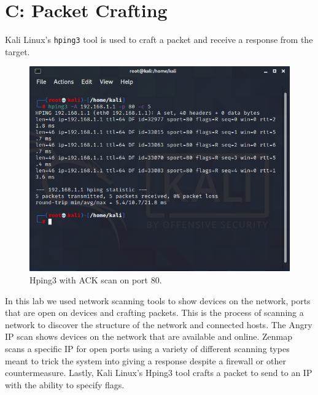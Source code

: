\section*{C: Packet Crafting}
Kali Linux's \verb|hping3| tool is used to craft a packet and receive a response from the target.

\begin{figure}[H]
    \centering
    \includegraphics[width=\linewidth]{figures/c1.png}
    \caption{Hping3 with ACK scan on port 80.}
\end{figure}

In this lab we used network scanning tools to show devices on the network, ports that are open on devices and crafting packets.
This is the process of scanning a network to discover the structure of the network and connected hosts.
The Angry IP scan shows devices on the network that are available and online.
Zenmap scans a specific IP for open ports using a variety of different scanning types meant to trick the system into giving a response despite a firewall or other countermeasure.
Lastly, Kali Linux's Hping3 tool crafts a packet to send to an IP with the ability to specify flags.